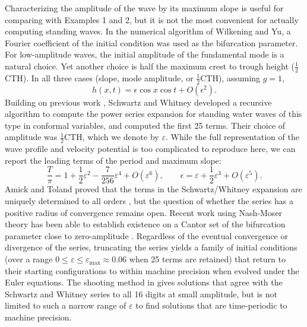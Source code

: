 \documentclass[11pt]{article}
\theoremstyle{plain}
\theoremstyle{definition}
\theoremstyle{definition}
\newcommand{\veps}{\varepsilon}
\newcommand{\eps}{\epsilon}
\begin{document}
Characterizing the amplitude of the wave by its maximum slope is
useful for comparing with Examples 1 and 2, but it is not the most
convenient for actually computing standing waves. In the numerical
algorithm of Wilkening and Yu\cite{wilkening-yu:shooting-2012}, a
Fourier coefficient of the initial condition was used as the
bifurcation parameter. For low-amplitude waves, the initial amplitude
of the fundamental mode is a natural choice.  Yet another choice is
half the maximum crest to trough height ($\frac12$CTH). In all three
cases (slope, mode amplitude, or $\frac12$CTH), assuming $g=1$,
%
\begin{equation}\label{eq:eps:stand}
  h(x,t) = \eps\cos x\cos t + O(\eps^2).
\end{equation}
%
Building on previous work \cite{rayleigh:1876,penney:52,tadjbakhsh},
Schwartz and Whitney \cite{schwartz:81} developed a recursive
algorithm to compute the power series expansion for standing water
waves of this type in conformal variables, and computed the first 25
terms. Their choice of amplitude was $\frac12$CTH, which we denote by
$\veps$. While the full representation of the wave profile and
velocity potential is too complicated to reproduce here, we can report
the leading terms of the period and maximum slope:
%
\begin{equation}
  \frac T{\pi}= 1+\frac12\veps^2-\frac7{256}\veps^4+O(\veps^6), \qquad
  \eps = \veps + \frac12\veps^3+O(\veps^5).
\end{equation}
%
Amick and Toland proved that the terms in the Schwartz/Whitney
expansion are uniquely determined to all orders \cite{amick:87}, but
the question of whether the series has a positive radius of
convergence remains open.  Recent work using Nash-Moser theory has
been able to establish existence on a Cantor set of the bifurcation
parameter close to zero-amplitude \cite{iooss:05}.  Regardless of the
eventual convergence or divergence of the series, truncating the
series yields a family of initial conditions (over a range
  $0\le\veps\le\veps_\text{max}\approx0.06$ when 25 terms are
  retained) that return to their starting configurations to within
machine precision when evolved under the Euler equations. The shooting
method in \cite{wilkening-yu:shooting-2012} gives solutions that agree
with the Schwartz and Whitney series to all 16 digits at small
amplitude, but is not limited to such a narrow range of $\veps$ to
find solutions that are time-periodic to machine precision.
\end{document}
